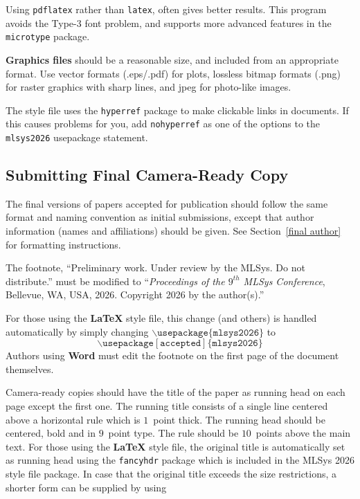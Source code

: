 \documentclass{article}
\begin{document}
Using \texttt{pdflatex} rather than \texttt{latex}, often gives better
results. This program avoids the Type-3 font problem, and supports more
advanced features in the \texttt{microtype} package.

\textbf{Graphics files} should be a reasonable size, and included from
an appropriate format. Use vector formats (.eps/.pdf) for plots,
lossless bitmap formats (.png) for raster graphics with sharp lines, and
jpeg for photo-like images.

The style file uses the \texttt{hyperref} package to make clickable
links in documents. If this causes problems for you, add
\texttt{nohyperref} as one of the options to the \texttt{mlsys2026}
usepackage statement.


\subsection{Submitting Final Camera-Ready Copy}

The final versions of papers accepted for publication should follow the
same format and naming convention as initial submissions, except that
author information (names and affiliations) should be given. See
Section~\ref{final author} for formatting instructions.

The footnote, ``Preliminary work. Under review by the MLSys. Do not distribute.'' 
must be modified to ``\textit{Proceedings of the
$\mathit{9}^{th}$ MLSys Conference},
Bellevue, WA, USA, 2026.
Copyright 2026 by the author(s).''

For those using the \textbf{\LaTeX} style file, this change (and others) is
handled automatically by simply changing
$\mathtt{\backslash usepackage\{mlsys2026\}}$ to
$$\mathtt{\backslash usepackage[accepted]\{mlsys2026\}}$$
Authors using \textbf{Word} must edit the
footnote on the first page of the document themselves.

Camera-ready copies should have the title of the paper as running head
on each page except the first one. The running title consists of a
single line centered above a horizontal rule which is $1$~point thick.
The running head should be centered, bold and in $9$~point type. The
rule should be $10$~points above the main text. For those using the
\textbf{\LaTeX} style file, the original title is automatically set as running
head using the \texttt{fancyhdr} package which is included in the MLSys
2026 style file package. In case that the original title exceeds the
size restrictions, a shorter form can be supplied by using
\end{document}
